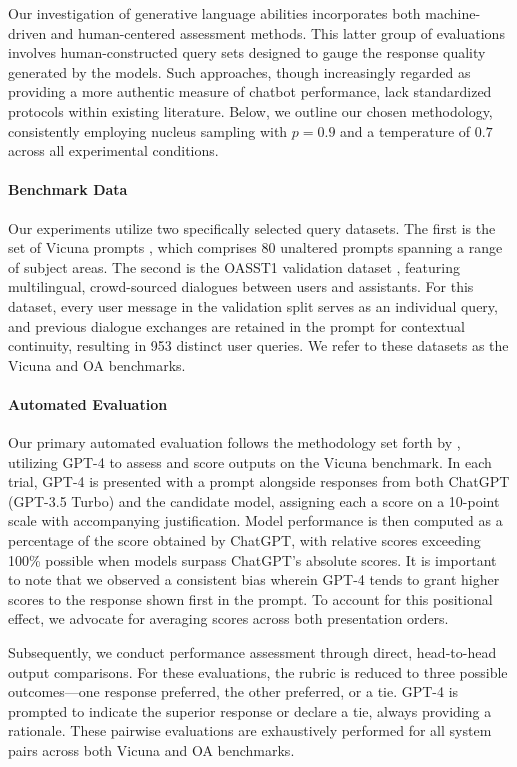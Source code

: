 Our investigation of generative language abilities incorporates both machine-driven and human-centered assessment methods. This latter group of evaluations involves human-constructed query sets designed to gauge the response quality generated by the models. Such approaches, though increasingly regarded as providing a more authentic measure of chatbot performance, lack standardized protocols within existing literature. Below, we outline our chosen methodology, consistently employing nucleus sampling with $p=0.9$ and a temperature of $0.7$ across all experimental conditions.

\paragraph{Benchmark Data} Our experiments utilize two specifically selected query datasets. The first is the set of Vicuna prompts \citep{vicuna2023}, which comprises 80 unaltered prompts spanning a range of subject areas. The second is the OASST1 validation dataset \citep{kopf2023openassistant}, featuring multilingual, crowd-sourced dialogues between users and assistants. For this dataset, every user message in the validation split serves as an individual query, and previous dialogue exchanges are retained in the prompt for contextual continuity, resulting in 953 distinct user queries. We refer to these datasets as the Vicuna and OA benchmarks.

\paragraph{Automated Evaluation} Our primary automated evaluation follows the methodology set forth by \citet{vicuna2023}, utilizing GPT-4 to assess and score outputs on the Vicuna benchmark. In each trial, GPT-4 is presented with a prompt alongside responses from both ChatGPT (GPT-3.5 Turbo) and the candidate model, assigning each a score on a 10-point scale with accompanying justification. Model performance is then computed as a percentage of the score obtained by ChatGPT, with relative scores exceeding 100\% possible when models surpass ChatGPT's absolute scores. It is important to note that we observed a consistent bias wherein GPT-4 tends to grant higher scores to the response shown first in the prompt. To account for this positional effect, we advocate for averaging scores across both presentation orders.

Subsequently, we conduct performance assessment through direct, head-to-head output comparisons. For these evaluations, the rubric is reduced to three possible outcomes—one response preferred, the other preferred, or a tie. GPT-4 is prompted to indicate the superior response or declare a tie, always providing a rationale. These pairwise evaluations are exhaustively performed for all system pairs across both Vicuna and OA benchmarks.

